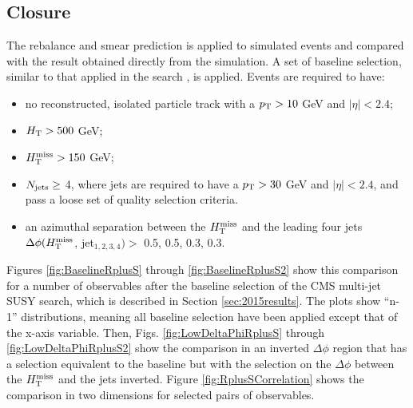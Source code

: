 \subsection{Closure}
The rebalance and smear prediction is applied to simulated events and compared with the result obtained directly from the simulation. A set of baseline selection, similar to that applied in the search \cite{Khachatryan:2016kdk}, is applied. Events are required to have:
\begin{itemize}
\item no reconstructed, isolated particle track with a $p_{\text{T}}>10$ GeV and $|\eta|<2.4$;
\item $H_{\rm T}>500$ GeV;
\item $H_{\text{T}}^{\rm miss}>150$ GeV;
\item $N_{\rm jets}\geq$ 4, where jets are required to have a $p_{\text{T}}>30$ GeV and $|\eta|<2.4$, and pass a loose set of quality selection criteria.
\item an azimuthal separation between the $H_{\text{T}}^{\rm miss}$ and the leading four jets $\Delta\phi(H_{\text{T}}^{\rm miss}$, jet$_{1,2,3,4})>$ 0.5, 0.5, 0.3, 0.3.
\end{itemize}
Figures \ref{fig:BaselineRplusS} through \ref{fig:BaselineRplusS2} show this comparison for a number of observables after the baseline selection of the CMS multi-jet SUSY search, which is described in Section \ref{sec:2015results}. The plots show ``n-1'' distributions, meaning all baseline selection have been applied except that of the x-axis variable. Then, Figs. \ref{fig:LowDeltaPhiRplusS} through \ref{fig:LowDeltaPhiRplusS2} show the comparison in an inverted $\Delta \phi$ region that has a selection equivalent to the baseline but with the selection on the $\Delta \phi$ between the $H_{\text{T}}^{\rm miss}$ and the jets inverted. Figure \ref{fig:RplusSCorrelation} shows the comparison in two dimensions for selected pairs of observables. 

